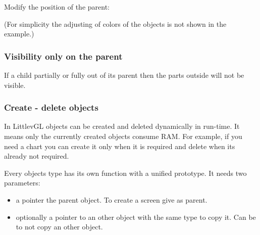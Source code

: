 \documentclass[letterpaper,10pt,english]{sphinxmanual}
\begin{document}
Modify the position of the parent:


\begin{sphinxVerbatim}[commandchars=\\\{\}]
  	
\end{sphinxVerbatim}

(For simplicity the adjusting of colors of the objects is not shown in the example.)


\subsubsection{Visibility only on the parent}
\label{\detokenize{overview/objects:visibility-only-on-the-parent}}
If a child partially or fully out of its parent then the parts outside will not be visible.


\begin{sphinxVerbatim}[commandchars=\\\{\}]
 	
\end{sphinxVerbatim}


\subsubsection{Create - delete objects}
\label{\detokenize{overview/objects:create-delete-objects}}
In LittlevGL objects can be created and deleted dynamically in run-time.
It means only the currently created objects consume RAM.
For example, if you need a chart you can create it only when it is required and delete when its already not required.

Every objects type has its own  function with a unified prototype.
It needs two parameters:
\begin{itemize}
\item {} 
a pointer the parent object. To create a screen give  as parent.

\item {} 
optionally a pointer to an other object with the same type to copy it. Can be  to not copy an other object.

\end{itemize}
\end{document}

